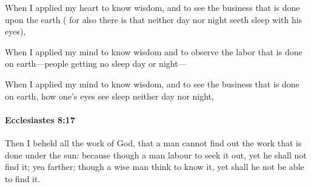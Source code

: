 			\begin{versebox}
					\item[BHS] 
					\item[LXX] 
					\item[ASV] When I applied my heart to know wisdom, and to see the business that is done upon the earth ( for also there is that neither day nor night seeth sleep with his eyes),
					\item[NIV] When I applied my mind to know wisdom and to observe the labor that is done on earth—people getting no sleep day or night—
					\item[NRSV] When I applied my mind to know wisdom, and to see the business that is done on earth, how one’s eyes see sleep neither day nor night,
			\end{versebox}

		\paragraph{Ecclesiastes 8:17} %
			\label{ECCLESIASTES-8-17}

			Then I beheld all the work of God, that a man cannot find out the work that is done under the sun: because though a man labour to seek it out, yet he shall not find it; yea farther; though a wise man think to know it, yet shall he not be able to find it.

